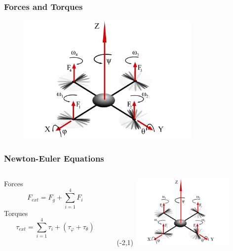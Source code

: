 
\begin{frame}
		\frametitle{Forces and Torques}
		\begin{figure}[p]
			\centering
			\includegraphics[width=0.8\textwidth]{images/Kraefte.pdf}
			\label{fig:Kraefte}
		\end{figure}
	\end{frame}

	\begin{frame}
		\frametitle{Newton-Euler Equations}
			\begin{columns}[T] %
				\begin{column}{0.70\textwidth}
					Forces \\
					\[ F_{ext} = F_{g} + \sum_{i=1}^{4}{F_{i}} \]
					Torques \\
					\[ \tau_{ext} = \sum_{i=1}^{4}{\tau_{i}}+(\tau_{\varphi}+\tau_{\theta}) \]
				\end{column}
			\hfill
			\begin{column}{.25\textwidth}
				\begin{textblock}{0}(-2,1)
					\includegraphics[width=5cm]{images/Kraefte.pdf}
					\label{fig:Kraefte klein}
				\end{textblock}
			\end{column}
		\end{columns}
	\end{frame}
		
